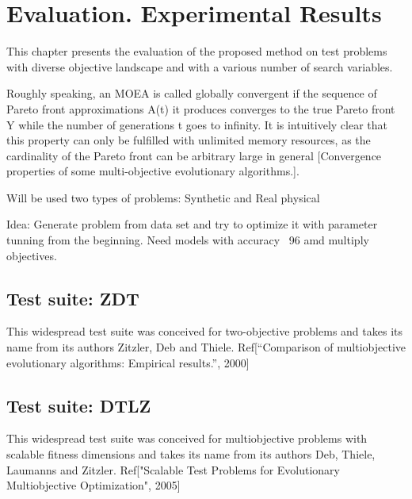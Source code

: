 \chapter{Evaluation. Experimental Results} 

This chapter presents the evaluation of the proposed method on test problems with diverse objective landscape and with a various number of search variables.


Roughly speaking, an MOEA is called globally convergent if the sequence of Pareto front approximations A(t) it produces converges to 
the true Pareto front Y while the number of generations t goes to infinity. It is intuitively clear that this property can only be 
fulfilled with unlimited memory resources, as the cardinality of the Pareto front can be arbitrary large in general [Convergence properties of some multi-objective evolutionary algorithms.].

\cite{kouwe2018benchmarking}

Will be used two types of problems: Synthetic and Real physical

Idea: Generate problem from data set and try to optimize it with parameter tunning from the beginning. 
Need models with accuracy ~96 amd multiply objectives. 

\section{Test suite: ZDT}
This widespread test suite was conceived for two-objective problems and takes its name from its authors Zitzler, Deb and Thiele.
Ref[“Comparison of multiobjective evolutionary algorithms: Empirical results.”, 2000]

\section{Test suite: DTLZ}
This widespread test suite was conceived for multiobjective problems with scalable fitness dimensions and takes its name from its authors Deb, Thiele, Laumanns and Zitzler.
Ref["Scalable Test Problems for Evolutionary Multiobjective Optimization", 2005]

